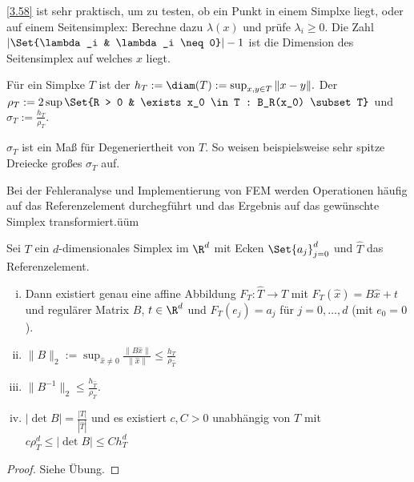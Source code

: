 \begin{note}
	\ref{3.58} ist sehr praktisch, um zu testen, ob ein Punkt in einem Simplxe liegt, oder auf einem Seitensimplex:
	Berechne dazu $\lambda(x)$ und prüfe $\lambda_i \ge 0$.
	Die Zahl $|\Set{\lambda_i & \lambda_i \neq 0}| - 1$ ist die Dimension des Seitensimplex auf welches $x$ liegt.
\end{note}

\begin{df} \label{3.59}
	Für ein Simplxe $T$ ist der 
	\begin{math}
		h_T := \diam(T) := \sup_{x,y \in T} \|x - y\|.
	\end{math}
	Der 
	\begin{math}
		\rho_T := 2 \sup \Set{R > 0 & \exists x_0 \in T : B_R(x_0) \subset T}
	\end{math}
	und
	\begin{math}
		\sigma_T := \frac{h_T}{\rho_T}.
	\end{math}
	\begin{note}
		$\sigma_T$ ist ein Maß für Degeneriertheit von $T$.
		So weisen beispielsweise sehr spitze Dreiecke großes $\sigma_T$ auf.
	\end{note}
\end{df}

Bei der Fehleranalyse und Implementierung von FEM werden Operationen häufig auf das Referenzelement durchegführt und das Ergebnis auf das gewünschte Simplex transformiert.üüm

\begin{st}[Referenzabbildung] \label{3.60}
	Sei $T$ ein $d$-dimensionales Simplex im $\R^d$ mit Ecken $\Set{a_j}_{j=0}^d$ und $\hat T$ das Referenzelement.
	\begin{enumerate}[i)]
		\item
			Dann existiert genau eine affine Abbildung $F_T: \hat T \to T$ mit $F_T(\hat x) = B\hat x + t$ und regulärer Matrix $B$, $t \in \R^d$ und $F_T(e_j) = a_j$ für $j = 0, \dotsc, d$ (mit $e_0 = 0$).
		\item
			\begin{math}
				\|B\|_2
				:= \sup_{\hat x \neq 0} \frac{\|B \hat x\|}{\|\hat x\|}
				\le \frac{h_T}{\rho_{\hat T}}
			\end{math}
		\item
			$\|B^{-1}\|_2 \le \frac{h_{\hat T}}{\rho_T}$.
		\item
			$|\det B| = \frac{|T|}{|\hat T|}$ und es existiert $c, C > 0$ unabhängig von $T$ mit
			\begin{math}
				c \rho_T^d
				\le |\det B|
				\le C h_T^d
			\end{math}
	\end{enumerate}
	\begin{proof}
		Siehe Übung.
	\end{proof}
\end{st}


